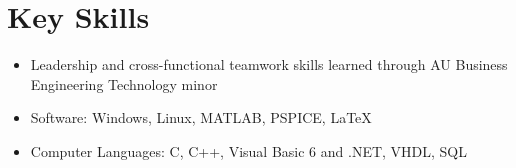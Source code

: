 \begin{resume}
\begin{position}
\end{position}

%
%


%
%



\section{\sc Key Skills}
\begin{itemize}
	\item Leadership and cross-functional teamwork skills learned through AU Business Engineering Technology minor
  \item Software: Windows, Linux, M\small{ATLAB}, PSPICE, \LaTeX
  \item Computer Languages: C, C++, Visual Basic 6 and .NET, VHDL, SQL
\end{itemize}


\end{resume}
